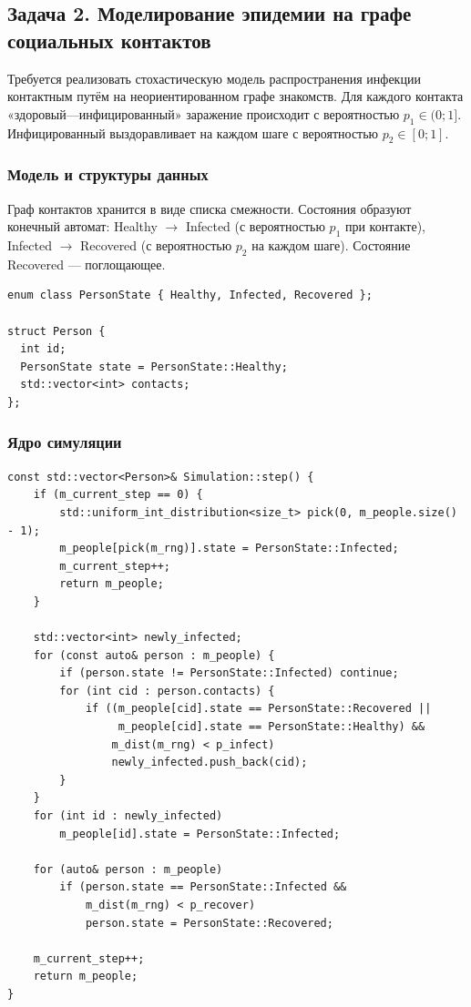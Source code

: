 \documentclass[14pt]{extarticle}
\begin{document}
\clearpage
\subsection{Задача 2. Моделирование эпидемии на графе социальных контактов}
\label{sec:org86f624c}

Требуется реализовать стохастическую модель распространения инфекции контактным путём на неориентированном графе знакомств. Для каждого контакта «здоровый---инфицированный» заражение происходит с вероятностью \(p_1 \in (0; 1]\). Инфицированный выздоравливает на каждом шаге с вероятностью \(p_2 \in [0; 1]\).
\subsubsection{Модель и структуры данных}
\label{sec:org694b3c4}

Граф контактов хранится в виде списка смежности. Состояния образуют конечный автомат: Healthy \(\to\) Infected (с вероятностью \(p_1\) при контакте), Infected \(\to\) Recovered (с вероятностью \(p_2\) на каждом шаге). Состояние Recovered --- поглощающее.

\begin{listing}[htbp]
\caption{Структура вершины и состояния эпидемиологической модели}
\begin{verbatim}
enum class PersonState { Healthy, Infected, Recovered };

struct Person {
  int id;
  PersonState state = PersonState::Healthy;
  std::vector<int> contacts;
};
\end{verbatim}
\end{listing}
\subsubsection{Ядро симуляции}
\label{sec:orgdceadac}

\begin{listing}[htbp]
\caption{Метод step() --- ядро симуляции}
\begin{verbatim}
const std::vector<Person>& Simulation::step() {
    if (m_current_step == 0) {
        std::uniform_int_distribution<size_t> pick(0, m_people.size() - 1);
        m_people[pick(m_rng)].state = PersonState::Infected;
        m_current_step++;
        return m_people;
    }

    std::vector<int> newly_infected;
    for (const auto& person : m_people) {
        if (person.state != PersonState::Infected) continue;
        for (int cid : person.contacts) {
            if ((m_people[cid].state == PersonState::Recovered ||
                 m_people[cid].state == PersonState::Healthy) &&
                m_dist(m_rng) < p_infect)
                newly_infected.push_back(cid);
        }
    }
    for (int id : newly_infected)
        m_people[id].state = PersonState::Infected;

    for (auto& person : m_people)
        if (person.state == PersonState::Infected &&
            m_dist(m_rng) < p_recover)
            person.state = PersonState::Recovered;

    m_current_step++;
    return m_people;
}
\end{verbatim}
\end{listing}
\end{document}
